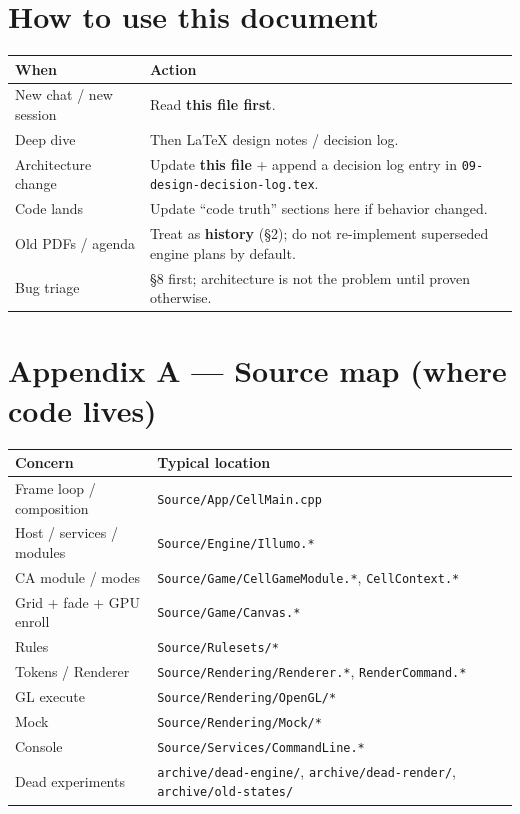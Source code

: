 \documentclass[10pt,a4paper]{article}
\begin{document}
\section{How to use this document}
\begin{table}[h!]
\centering
\small
\begin{tabularx}{\textwidth}{l X}
\toprule
\textbf{When} & \textbf{Action} \\
\midrule
New chat / new session & Read \textbf{this file first}. \\
Deep dive & Then LaTeX design notes / decision log. \\
Architecture change & Update \textbf{this file} + append a decision log entry in \texttt{09-design-decision-log.tex}. \\
Code lands & Update ``code truth'' sections here if behavior changed. \\
Old PDFs / agenda & Treat as \textbf{history} (\S 2); do not re-implement superseded engine plans by default. \\
Bug triage & \S 8 first; architecture is not the problem until proven otherwise. \\
\bottomrule
\end{tabularx}
\end{table}

\newpage
\appendix
\section{Appendix A --- Source map (where code lives)}
\begin{table}[h!]
\centering
\small
\begin{tabularx}{\textwidth}{l X}
\toprule
\textbf{Concern} & \textbf{Typical location} \\
\midrule
Frame loop / composition & \texttt{Source/App/CellMain.cpp} \\
Host / services / modules & \texttt{Source/Engine/Illumo.*} \\
CA module / modes & \texttt{Source/Game/CellGameModule.*}, \texttt{CellContext.*} \\
Grid + fade + GPU enroll & \texttt{Source/Game/Canvas.*} \\
Rules & \texttt{Source/Rulesets/*} \\
Tokens / Renderer & \texttt{Source/Rendering/Renderer.*}, \texttt{RenderCommand.*} \\
GL execute & \texttt{Source/Rendering/OpenGL/*} \\
Mock & \texttt{Source/Rendering/Mock/*} \\
Console & \texttt{Source/Services/CommandLine.*} \\
Dead experiments & \texttt{archive/dead-engine/}, \texttt{archive/dead-render/}, \texttt{archive/old-states/} \\
\bottomrule
\end{tabularx}
\end{table}
\end{document}
